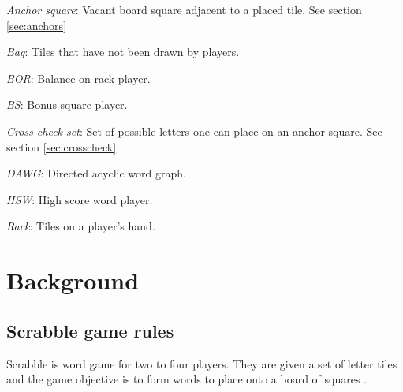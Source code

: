 \documentclass[a4paper, 12pt]{report}
\begin{document}
\begin{description}
\item{\emph{Anchor square}}: Vacant board square adjacent to a placed tile. See section \ref{sec:anchors}

\item{\emph{Bag}}: Tiles that have not been drawn by players.

\item{\emph{BOR}}: Balance on rack player.

\item{\emph{BS}}: Bonus square player.

\item{\emph{Cross check set}}: Set of possible letters one can place on an anchor square. See section \ref{sec:crosscheck}.

\item{\emph{DAWG}}: Directed acyclic word graph.

\item{\emph{HSW}}: High score word player.

\item{\emph{Rack}}: Tiles on a player's hand. 

\end{description}







\chapter{Background}

\section{Scrabble game rules}
Scrabble is word game for two to four players. They are given a set of letter tiles and the game objective is to form words to place onto a board of squares \cite{ABSP} \cite{NASPA} \cite{forbund}.
\end{document}

